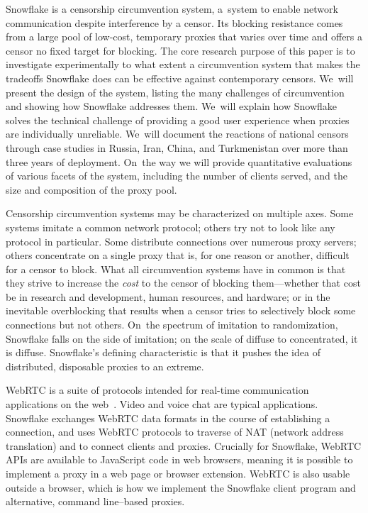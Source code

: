 \documentclass[letterpaper,twocolumn]{article}
\begin{document}
Snowflake is a censorship circumvention system,
a~system to enable network communication
despite interference by a censor.
Its blocking resistance comes from a large pool
of low-cost, temporary proxies
that varies over time
and offers a censor no fixed target for blocking.
The core research purpose of this paper
is to investigate experimentally to what extent
a circumvention system that makes the tradeoffs Snowflake does
can be effective against contemporary censors.
We~will present the design of the system,
listing the many challenges of circumvention
and showing how Snowflake addresses them.
We~will explain how Snowflake solves the technical challenge
of providing a good user experience
when proxies are individually unreliable.
We~will document the reactions of national censors
through case studies in
Russia, Iran, China, and Turkmenistan
over more than three years of deployment.
On~the way we will provide quantitative evaluations
of various facets of the system,
including the number of clients served,
and the size and composition of the proxy pool.

Censorship circumvention systems may
be characterized on multiple axes.
Some systems imitate a common network protocol;
others try
not to look like any protocol in particular.
Some distribute connections over numerous proxy servers;
others concentrate on a single proxy
that is, for one reason or another, difficult for a censor to block.
What all circumvention systems have in common
is that they strive to increase the \emph{cost}
to the censor of blocking them---whether that cost be in
research and development, human resources, and hardware;
or in the inevitable overblocking that results
when a censor tries to selectively block
some connections but not others.
On~the spectrum of imitation to randomization,
Snowflake falls on the side of imitation;
on the scale of diffuse to concentrated, it is diffuse.
Snowflake's defining characteristic is that it
pushes the idea of distributed, disposable
proxies to an extreme.

WebRTC is a suite of protocols
intended for real-time communication applications
on the web~\cite{rfc8825}.
Video and voice chat are typical applications.
Snowflake exchanges WebRTC data formats
in the course of establishing a connection,
and uses WebRTC protocols to traverse of NAT (network address translation)
and to connect clients and proxies.
Crucially for Snowflake, WebRTC APIs
are available to JavaScript code in web browsers,
meaning it is possible to implement a proxy
in a web page or browser extension.
WebRTC is also usable outside a browser,
which is how we implement the Snowflake client program
and alternative, command line--based proxies.
\end{document}
